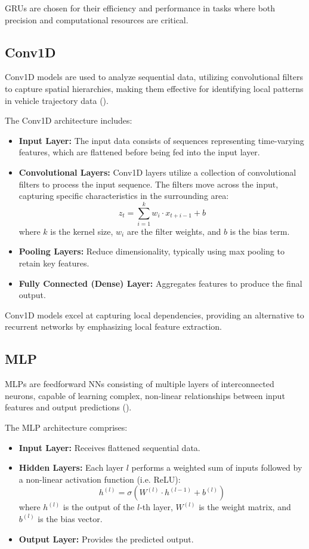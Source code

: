 \documentclass[journal,onecolumn]{IEEEtran}
\begin{document}
{GRUs are chosen for their efficiency and performance in tasks where both precision and computational resources are critical.

\subsection{Conv1D}
Conv1D models are used to analyze sequential data, utilizing convolutional filters to capture spatial hierarchies, making them effective for identifying local patterns in vehicle trajectory data (\cite{jymssp21kiranyaz}).

The Conv1D architecture includes:
\begin{itemize}
    \item \textbf{Input Layer:} The input data consists of sequences representing time-varying features, which are flattened before being fed into the input layer.
    \item \textbf{Convolutional Layers:} Conv1D layers utilize a collection of convolutional filters to process the input sequence. The filters move across the input, capturing specific characteristics in the surrounding area:
    \[
    z_t = \sum_{i=1}^{k} w_i \cdot x_{t+i-1} + b
    \]
    where \( k \) is the kernel size, \( w_i \) are the filter weights, and \( b \) is the bias term.
    \item \textbf{Pooling Layers:} Reduce dimensionality, typically using max pooling to retain key features.
    \item \textbf{Fully Connected (Dense) Layer:} Aggregates features to produce the final output.
\end{itemize}

Conv1D models excel at capturing local dependencies, providing an alternative to recurrent networks by emphasizing local feature extraction.

\subsection{MLP}
MLPs are feedforward NNs consisting of multiple layers of interconnected neurons, capable of learning complex, non-linear relationships between input features and output predictions (\cite{cikm23zhang}).

The MLP architecture comprises:
\begin{itemize}
    \item \textbf{Input Layer:} Receives flattened sequential data.
    \item \textbf{Hidden Layers:} Each layer \( l \) performs a weighted sum of inputs followed by a non-linear activation function (i.e. ReLU):
    \[
    h^{(l)} = \sigma(W^{(l)} \cdot h^{(l-1)} + b^{(l)})
    \]
    where \( h^{(l)} \) is the output of the \( l \)-th layer, \( W^{(l)} \) is the weight matrix, and \( b^{(l)} \) is the bias vector.
    \item \textbf{Output Layer:} Provides the predicted output.
\end{itemize}

}
\end{document}
